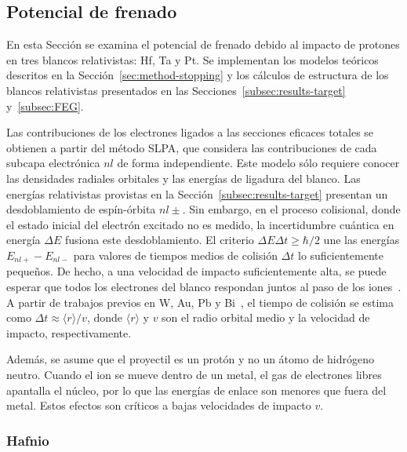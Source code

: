 \subsection{Potencial de frenado}
\label{subsec:results-stopping}

En esta Sección se examina el potencial de frenado debido al impacto de 
protones en tres blancos relativistas: Hf, Ta y Pt. Se implementan los 
modelos teóricos descritos en la Sección~\ref{sec:method-stopping} y los
cálculos de estructura de los blancos relativistas presentados en las 
Secciones~\ref{subsec:results-target} y~\ref{subsec:FEG}.

Las contribuciones de los electrones ligados a las secciones eficaces 
totales se obtienen a partir del método SLPA, que considera las 
contribuciones de cada subcapa electrónica $nl$ de forma independiente.
Este modelo sólo requiere conocer las densidades radiales orbitales y
las energías de ligadura del blanco. Las energías relativistas provistas
en la Sección~\ref{subsec:results-target} presentan un desdoblamiento de 
espín-órbita $nl\pm$. Sin embargo, en el proceso colisional, donde el 
estado inicial del electrón excitado no es medido, la incertidumbre 
cuántica en energía $\Delta E$ fusiona este desdoblamiento. El criterio 
$\Delta E\Delta t\geq\hbar/2$ une las energías $E_{nl+}-E_{nl-}$ para 
valores de tiempos medios de colisión $\Delta t$ lo suficientemente 
pequeños. De hecho, a una velocidad de impacto suficientemente alta, se 
puede esperar que todos los electrones del blanco respondan juntos al 
paso de los iones~\cite{Lindhard:53,Chu:72}. A partir de trabajos 
previos en W, Au, Pb y Bi~\cite{Montanari:09}, el tiempo de colisión se 
estima como $\Delta t\approx\langle r\rangle/v$, donde $\langle r\rangle$ 
y $v$ son el radio orbital medio y la velocidad de impacto, 
respectivamente.

Además, se asume que el proyectil es un protón y no un átomo de 
hidrógeno neutro. Cuando el ion se mueve dentro de un metal, el gas de 
electrones libres apantalla el núcleo, por lo que las energías de enlace 
son menores que fuera del metal. Estos efectos son críticos a bajas 
velocidades de impacto $v$.

\subsubsection{Hafnio}


